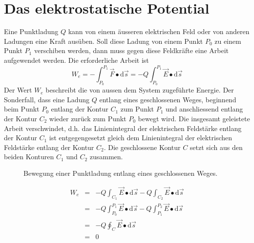 \section{Das elektrostatische Potential}
Eine Punktladung $Q$ kann von einem äusseren elektrischen Feld oder von anderen Ladungen eine Kraft ausüben. Soll diese Ladung von einem Punkt $P_0$ zu einem Punkt $P_1$ verschiben werden, dann muss gegen diese Feldkräfte eine Arbeit aufgewendet werden. Die erforderliche Arbeit ist
\begin{equation} 
\boxed{W_e=-\displaystyle \int_{P_0}^{P_1}\overrightarrow{F}\bullet \text{d}\overrightarrow{s}=-Q\displaystyle \int_{P_0}^{P_1}\overrightarrow{E}\bullet \text{d}\overrightarrow{s}}
\end{equation} 
\noindent Der Wert $W_e$ beschreibt die von aussen dem System zugeführte Energie. Der Sonderfall, dass eine Ladung $Q$ entlang eines geschlossenen Weges, beginnend beim Punkt $P_0$ entlang der Kontur $C_1$ zum Punkt $P_1$ und anschliessend entlang der Kontur $C_2$ wieder zurück zum Punkt $P_0$ bewegt wird. Die insgesamt geleistete Arbeit verschwindet, d.h. das Linienintegral der elektrischen Feldstärke entlang der Kontur $C_1$ ist entgegengesetzt gleich dem Linienintegral der elektrischen Feldstärke entlang der Kontur $C_2$. Die geschlossene Kontur $C$ setzt sich aus den beiden Konturen $C_1$ und $C_2$ zusammen.
\begin{figure}[H]
\centering
\caption{Bewegung einer Punktladung entlang eines geschlossenen Weges.}
\label{fig_If}
\end{figure}
\begin{equation}
\boxed{
\begin{array}{lll}
W_e&=&-Q\displaystyle \int_{C_1}\overrightarrow{E}\bullet \text{d}\overrightarrow{s}-Q\displaystyle \int_{C_2}\overrightarrow{E}\bullet \text{d}\overrightarrow{s}\\
&=&-Q\displaystyle \int_{P_0}^{P_1}\overrightarrow{E}\bullet \text{d}\overrightarrow{s}-Q\displaystyle \int_{P_1}^{P_2}\overrightarrow{E}\bullet \text{d}\overrightarrow{s}\\
&=&-Q\displaystyle \oint_{C}\overrightarrow{E}\bullet \text{d}\overrightarrow{s}\\
&=&0
\end{array}}
\end{equation}
